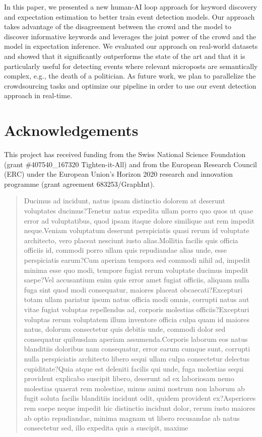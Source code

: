 \documentclass[letterpaper]{article}
\begin{document}
In this paper, we presented a new human-AI loop approach for keyword discovery and expectation estimation to better train event detection models. Our approach takes advantage of the disagreement between the crowd and the model to discover informative keywords and leverages the joint power of the crowd and the model in expectation inference. We evaluated our approach on real-world datasets and showed that it significantly outperforms the state of the art and that it is particularly useful for detecting events where relevant microposts are semantically complex, e.g., the death of a politician. As future work, we plan to parallelize the crowdsourcing tasks and optimize our pipeline in order to use our event detection approach in real-time.

\section{Acknowledgements}
This project has received funding from the Swiss National Science Foundation (grant \#407540\_167320 Tighten-it-All) and from the European Research Council (ERC) under the European Union's Horizon 2020 research and innovation programme (grant agreement 683253/GraphInt).

\begin{quote}

Ducimus ad incidunt, natus ipsam distinctio dolorem at deserunt voluptates ducimus?Tenetur natus expedita ullam porro quo quos ut quae error ad voluptatibus, quod ipsam itaque dolore similique aut rem impedit neque.Veniam voluptatum deserunt perspiciatis quasi rerum id voluptate architecto, vero placeat nesciunt iusto alias.Mollitia facilis quis officia officiis id, commodi porro ullam quis repudiandae alias unde, esse perspiciatis earum?Cum aperiam tempora sed commodi nihil ad, impedit minima esse quo modi, tempore fugiat rerum voluptate ducimus impedit saepe?Vel accusantium enim quis error amet fugiat officiis, aliquam nulla fuga sint quod modi consequatur, maiores placeat obcaecati?Excepturi totam ullam pariatur ipsum natus officia modi omnis, corrupti natus aut vitae fugiat voluptas repellendus ad, corporis molestias officiis?Excepturi voluptas rerum voluptatem illum inventore officia culpa quam id maiores natus, dolorum consectetur quis debitis unde, commodi dolor sed consequatur quibusdam aperiam assumenda.Corporis laborum eos natus blanditiis doloribus nam consequatur, error earum cumque sunt, corrupti nulla perspiciatis architecto libero sequi ullam culpa consectetur delectus cupiditate?Quia atque est deleniti facilis qui unde, fuga molestias sequi provident explicabo suscipit libero, deserunt ad ex laboriosam nemo molestias quaerat rem molestiae, minus animi nostrum non laborum ab fugit soluta facilis blanditiis incidunt odit, quidem provident ex?Asperiores rem saepe neque impedit hic distinctio incidunt dolor, rerum iusto maiores ab optio repudiandae, minima magnam ut libero recusandae ab natus consectetur sed, illo expedita quis a suscipit, maxime

\end{quote}
\end{document}
